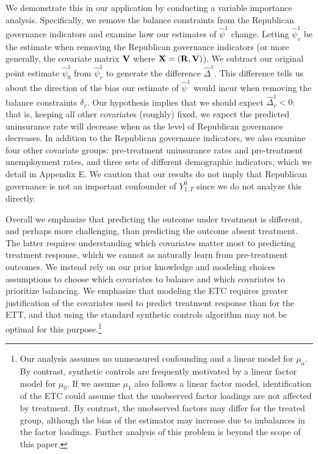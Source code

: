 We demonstrate this in our application by conducting a variable importance analysis. Specifically, we remove the balance constraints from the Republican governance indicators and examine how our estimates of $\hat{\psi}^1$ change. Letting $\hat{\psi}^1_v$ be the estimate when removing the Republican governance indicators (or more generally, the covariate matrix $\mathbf{V}$ where $\mathbf{X} = (\mathbf{R}, \mathbf{V})$). We subtract our original point estimate $\hat{\psi}^1_0$ from $\hat{\psi}^1_v$ to generate the difference $\hat{\Delta}^1$. This difference tells us about the direction of the bias our estimate of $\hat{\psi}^1$ would incur when removing the balance constraints $\delta_v$. Our hypothesis implies that we should expect $\hat{\Delta}_v^1 < 0$: that is, keeping all other covariates (roughly) fixed, we expect the predicted uninsurance rate will decrease when as the level of Republican governance decreases. In addition to the Republican governance indicators, we also examine four other covariate groups: pre-treatment uninsurance rates and pre-treatment unemployment rates, and three sets of different demographic indicators, which we detail in Appendix E. We caution that our results do not imply that Republican governance is not an important confounder of $Y^0_{1, T}$ since we do not analyze this directly. 

Overall we emphasize that predicting the outcome under treatment is different, and perhaps more challenging, than predicting the outcome absent treatment. The latter requires understanding which covariates matter most to predicting treatment response, which we cannot as naturally learn from pre-treatment outcomes. We instead rely on our prior knowledge and modeling choices assumptions to choose which covariates to balance and which covariates to prioritize balancing. We emphasize that modeling the ETC requires greater justification of the covariates used to predict treatment response than for the ETT, and that using the standard synthetic controls algorithm may not be optimal for this purpose.\footnote{Our analysis assumes no unmeasured confounding and a linear model for $\mu_a$. By contrast, synthetic controls are frequently motivated by a linear factor model for $\mu_0$. If we assume $\mu_1$ also follows a linear factor model, identification of the ETC could assume that the unobserved factor loadings are not affected by treatment. By contrast, the unobserved factors may differ for the treated group, although the bias of the estimator may increase due to imbalances in the factor loadings. Further analysis of this problem is beyond the scope of this paper.}

